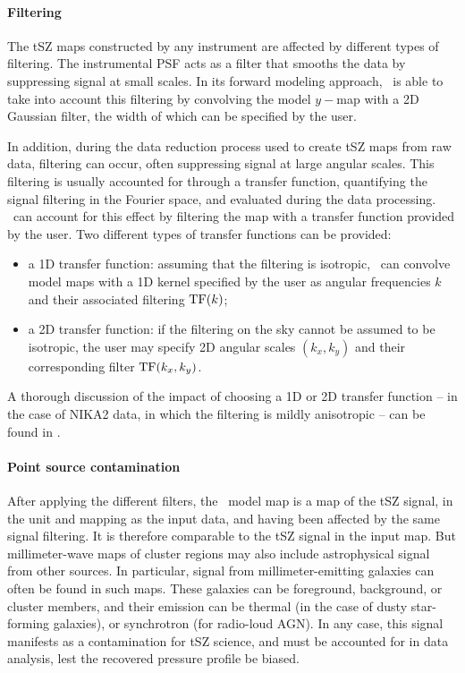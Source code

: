 \paragraph{Filtering}

The tSZ maps constructed by any instrument are affected by different types of filtering.
The instrumental PSF acts as a filter that smooths the data by suppressing signal at small scales.
In its forward modeling approach, \panco\ is able to take into account this filtering by convolving the model $y-$map with a 2D Gaussian filter, the width of which can be specified by the user.

In addition, during the data reduction process used to create tSZ maps from raw data, filtering can occur, often suppressing signal at large angular scales.
This filtering is usually accounted for through a transfer function, quantifying the signal filtering in the Fourier space, and evaluated during the data processing.
\panco\ can account for this effect by filtering the map with a transfer function provided by the user.
Two different types of transfer functions can be provided:
\begin{itemize}[leftmargin=*]
    \item a 1D transfer function: assuming that the filtering is isotropic, \panco\ can convolve model maps with a 1D kernel specified by the user as angular frequencies $k$ and their associated filtering ${\rm TF}(k)$;
    \item a 2D transfer function: if the filtering on the sky cannot be assumed to be isotropic, the user may specify 2D angular scales $(k_x, k_y)$ and their corresponding filter ${\rm TF}(k_x, k_y)$.
\end{itemize}
A thorough discussion of the impact of choosing a 1D or 2D transfer function -- in the case of NIKA2 data, in which the filtering is mildly anisotropic -- can be found in \citet{munoz-echeverria_multi-probe_2022}.

\paragraph{Point source contamination}

After applying the different filters, the \panco\ model map is a map of the tSZ signal, in the unit and mapping as the input data, and having been affected by the same signal filtering.
It is therefore comparable to the tSZ signal in the input map.
But millimeter-wave maps of cluster regions may also include astrophysical signal from other sources.
In particular, signal from millimeter-emitting galaxies can often be found in such maps.
These galaxies can be foreground, background, or cluster members, and their emission can be thermal (in the case of dusty star-forming galaxies), or synchrotron (for radio-loud AGN).
In any case, this signal manifests as a contamination for tSZ science, and must be accounted for in data analysis, lest the recovered pressure profile be biased.

